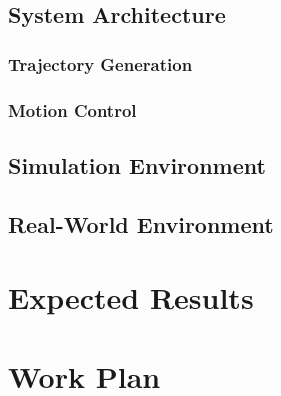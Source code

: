 \documentclass[a4paper, oneside]{article}
\begin{document}
    \subsection{System Architecture}
    \label{sec:Proposed Approach:System Architecture}
    

    \subsubsection{Trajectory Generation}
    \label{sec:Proposed Approach:Reference Trajectory}
    

    \subsubsection{Motion Control}
    \label{sec:Proposed Approach:Controler}
    

    \subsection{Simulation Environment}
    \label{sec:Proposed Approach:Simulator}
    

    \subsection{Real-World Environment}
    \label{sec:Proposed Approach:Real World}
    

    
\section{Expected Results}
    \label{sec:Results:Expected Results}
    

\clearpage
\section{Work Plan}
    \label{sec:Work Plan}
    
\nocite{*} %
\printbibliography[heading=bibintoc]

\appendix
\end{document}
